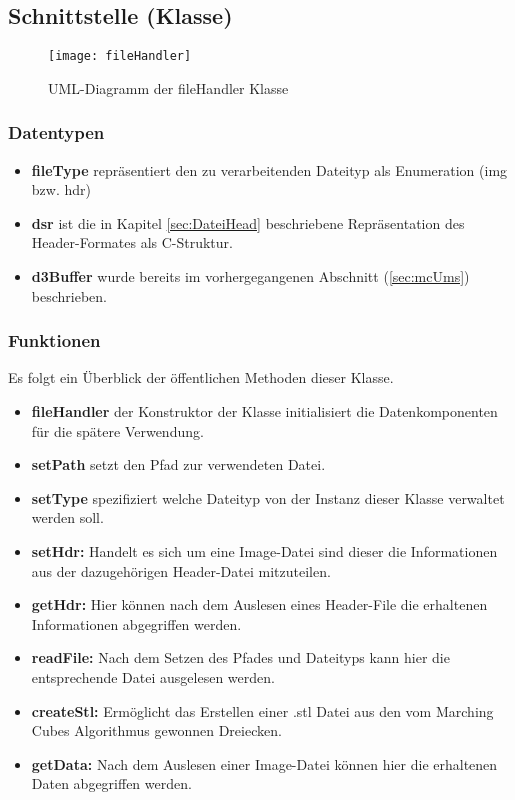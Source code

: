 \subsection{Schnittstelle (Klasse)}
\begin{figure}
	\centering
	\texttt{[image: fileHandler]}
	\caption{UML-Diagramm der fileHandler Klasse}
	\label{fig:fileHandler}
\end{figure}
\subsubsection{Datentypen}
\begin{itemize}
	\item \textbf{fileType} repräsentiert den zu verarbeitenden Dateityp als Enumeration (img bzw. hdr) 
	\item \textbf{dsr} ist die in Kapitel \ref{sec:DateiHead} beschriebene Repräsentation des Header-Formates als C-Struktur.
	\item \textbf{d3Buffer} wurde bereits im vorhergegangenen Abschnitt (\ref{sec:mcUms}) beschrieben.
\end{itemize}
\subsubsection{Funktionen}
Es folgt ein Überblick der öffentlichen Methoden dieser Klasse.\\
\begin{itemize}
	\item \textbf{fileHandler} der Konstruktor der Klasse initialisiert die Datenkomponenten für die spätere Verwendung.
	\item \textbf{setPath} setzt den Pfad zur verwendeten Datei.
	\item \textbf{setType} spezifiziert welche Dateityp von der Instanz dieser Klasse verwaltet werden soll.
	\item \textbf{setHdr:} Handelt es sich um eine Image-Datei sind dieser die Informationen aus der dazugehörigen Header-Datei mitzuteilen. 
	\item \textbf{getHdr:} Hier können nach dem Auslesen eines Header-File die erhaltenen Informationen abgegriffen werden. 
	\item \textbf{readFile:} Nach dem Setzen des Pfades und Dateityps kann hier die entsprechende Datei ausgelesen werden.
	\item \textbf{createStl:} Ermöglicht das Erstellen einer .stl Datei aus den vom Marching Cubes Algorithmus gewonnen Dreiecken. 
	\item \textbf{getData:} Nach dem Auslesen einer Image-Datei können hier die erhaltenen Daten abgegriffen werden.
\end{itemize}
